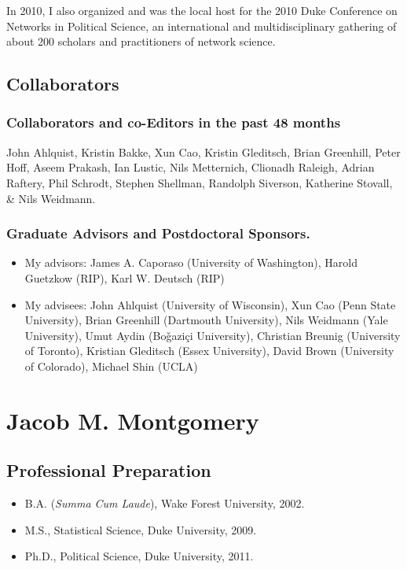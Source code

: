 \documentclass[pdftex,12pt,fullpage,oneside]{amsart}
\begin{document}
In 2010, I also organized and was the local host for the 2010 Duke
Conference on Networks in Political Science, an international and
multidisciplinary gathering of about 200 scholars and practitioners of
network science.


\subsection*{Collaborators}

\subsubsection*{Collaborators and co-Editors in the past 48 months}
John Ahlquist, Kristin Bakke, Xun Cao, Kristin Gleditsch, Brian
Greenhill, Peter Hoff, Aseem Prakash, Ian Lustic, Nils Metternich,
Clionadh Raleigh, Adrian Raftery, Phil Schrodt, Stephen Shellman,
Randolph Siverson, Katherine Stovall, \& Nils Weidmann.
\subsubsection*{Graduate Advisors and Postdoctoral Sponsors.}
\begin{itemize}
\item[] My advisors: James A. Caporaso (University of Washington),
  Harold Guetzkow (RIP), Karl W. Deutsch (RIP)
\item[] My advisees: John Ahlquist (University of Wisconsin), Xun Cao
  (Penn State University), Brian Greenhill (Dartmouth University),
  Nils Weidmann (Yale University), Umut Aydin (Bo\v{g}azi\c{c}i
  University), Christian Breunig (University of Toronto), Kristian
  Gleditsch (Essex University), David Brown (University of Colorado),
  Michael Shin (UCLA)
\end{itemize}

\newpage


\newpage
\setcounter{page}{1}
\thispagestyle{empty}

\section*{Jacob M. Montgomery}
\subsection*{Professional Preparation}
\begin{itemize}
\item[]B.A. (\textit{Summa Cum Laude}), Wake Forest University, 2002.
\item[]M.S., Statistical Science, Duke University, 2009. 
\item[]Ph.D., Political Science, Duke University, 2011. 
\end{itemize}
\end{document}
